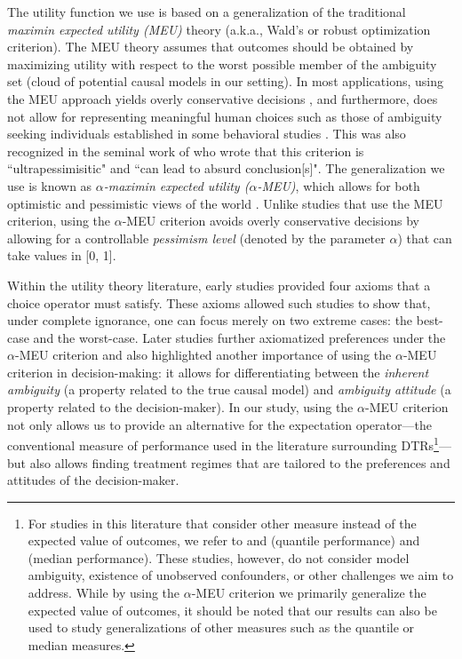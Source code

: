 \documentclass[opre,nonblindrev]{informs2}%
\newcommand{\1}{\hbox{\rm 1\kern-.35em 1}}
\begin{document}
The utility function we use is based on a generalization of the traditional {\em maximin expected utility (MEU)} theory (a.k.a.,  Wald's or robust optimization criterion).  The MEU theory assumes that outcomes should  be obtained by maximizing utility with respect to the worst possible member of the ambiguity set (cloud of potential causal models in our setting).  In most applications, using the MEU approach  yields overly conservative decisions \citep[for related discussions, see, e.g.,][and the references therein]{Saghafian2018}, and furthermore, does not allow for representing meaningful human choices such as those of ambiguity seeking individuals established in some behavioral studies \citep[see, e.g.,][]{Bhide2000, Heath1991, Ahn2014}. This was also recognized in the seminal work of \cite{Savage1951} who wrote that this criterion is ``ultrapessimisitic" and ``can lead to absurd conclusion[s]". The generalization we use is known as {\em $\alpha$-maximin expected utility ($\alpha$-MEU)}, which allows for both optimistic and pessimistic views of the world \citep{ArrowHurwitcz, Hurwicz1951a, Hurwicz1951b, Ghiradato2004, Saghafian2018}. Unlike studies that use the MEU criterion, using the $\alpha$-MEU criterion avoids overly conservative decisions by allowing for a controllable {\em pessimism level} (denoted by the parameter $\alpha$) that can take values in [0, 1].

Within the utility theory literature, early studies  \citep[see, e.g.,][]{ArrowHurwitcz, Hurwicz1951a, Hurwicz1951b} provided four axioms that a choice operator must
satisfy. These axioms allowed such studies to show that, under complete ignorance, one can focus merely on two
extreme cases: the best-case and the worst-case. Later studies \citep[see, e.g.,][]{Ghiradato2004, Marinacci2002} further axiomatized preferences under the $\alpha$-MEU criterion  and also highlighted another importance of using the $\alpha$-MEU criterion in decision-making: it allows for differentiating  between the {\em inherent ambiguity} (a property related to the true causal model) and {\em ambiguity attitude} (a property related to the decision-maker). In our study, using the $\alpha$-MEU criterion not only allows us to provide an alternative for the expectation operator---the conventional measure of performance used in the literature surrounding DTRs\footnote{For studies in this literature that consider other measure instead of  the expected value of outcomes, we refer to \cite{Linn2017} and \cite{Wang2018} (quantile performance) and \cite{Leqi2021} (median performance). These studies, however, do not consider model ambiguity, existence of unobserved confounders, or other challenges we aim to address.  While by using the $\alpha$-MEU criterion we primarily generalize the expected value of outcomes, it should be noted that our results can also be used to study generalizations of other measures such as the quantile or median measures.}---but also allows finding treatment regimes that are tailored to the preferences and  attitudes of the decision-maker.
\end{document}
